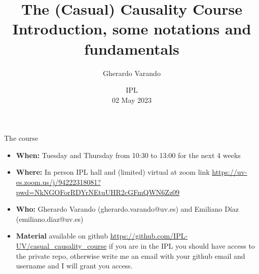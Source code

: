 \documentclass{beamer}
\institute[]{}
\title{The (Casual) Causality Course \\ Introduction, some notations and fundamentals}
\author{Gherardo Varando}
\date{IPL \\ 02 May 2023}
\begin{document}
\begin{frame}
	\titlepage
\end{frame}

\begin{frame}{The course}

	\begin{itemize}
		\item \textbf{When:} Tuesday and Thursday from 10:30 to 13:00 for the next 4 weeks
		\item \textbf{Where:} In person IPL hall and (limited) virtual at zoom link
			              \url{https://uv-es.zoom.us/j/94222318081?pwd=NkNGOForRDYrNEtuUHR2cGFmQWN6Zz09}
		\item \textbf{Who:}  Gherardo Varando (gherardo.varando@uv.es) and 
			Emiliano Díaz (emiliano.diaz@uv.es)
		\item \textbf{Material} available on github \url{https://github.com/IPL-UV/casual_causality_course} if you are in the IPL you should have access to the private repo, otherwise write me an email with your github email and username and I will grant you access. 
	\end{itemize}

\end{frame}
\end{document}
